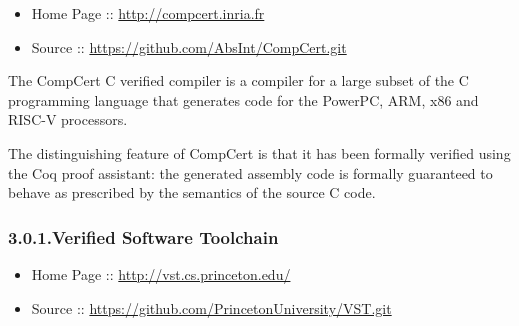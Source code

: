 \documentclass[12pt,twoside]{article}
\begin{document}
\begin{itemize}[noitemsep,topsep=\mdcompacttopsep]%

\item{}Home Page :: \href{http://compcert.inria.fr}{{\ttfamily http://\hspace{0pt}compcert.\hspace{0pt}inria.\hspace{0pt}fr}}%

\item{}Source :: \href{https://github.com/AbsInt/CompCert.git}{{\ttfamily https://\hspace{0pt}github.\hspace{0pt}com/\hspace{0pt}AbsInt/\hspace{0pt}CompCert.\hspace{0pt}git}}%
\end{itemize}%

\noindent{}The CompCert C verified compiler is a compiler for a large subset of
the C programming language that generates code for the PowerPC, ARM,
x86 and RISC-V processors.%

The distinguishing feature of CompCert is that it has been formally
verified using the Coq proof assistant: the generated assembly code is
formally guaranteed to behave as prescribed by the semantics of the
source C code.%

\subsubsection{3.0.1.\hspace*{0.5em}Verified Software Toolchain}\label{sec-verified-software-toolchain}%

\begin{itemize}[noitemsep,topsep=\mdcompacttopsep]%

\item{}Home Page :: \href{http://vst.cs.princeton.edu/}{{\ttfamily http://\hspace{0pt}vst.\hspace{0pt}cs.\hspace{0pt}princeton.\hspace{0pt}edu/\hspace{0pt}}}%

\item{}Source :: \href{https://github.com/PrincetonUniversity/VST.git}{{\ttfamily https://\hspace{0pt}github.\hspace{0pt}com/\hspace{0pt}PrincetonUniversity/\hspace{0pt}VST.\hspace{0pt}git}}%
\end{itemize}%
\end{document}
